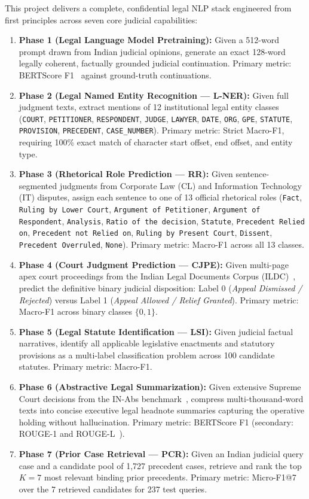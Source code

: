 \documentclass[11pt, oneside]{article}
\begin{document}
This project delivers a complete, confidential legal NLP stack engineered from first principles across seven core judicial capabilities:
\begin{enumerate}
    \item \textbf{Phase 1 (Legal Language Model Pretraining):} Given a 512-word prompt drawn from Indian judicial opinions, generate an exact 128-word legally coherent, factually grounded judicial continuation. Primary metric: BERTScore F1~\cite{zhang2020bertscore} against ground-truth continuations.
    \item \textbf{Phase 2 (Legal Named Entity Recognition --- L-NER):} Given full judgment texts, extract mentions of 12 institutional legal entity classes (\texttt{COURT}, \texttt{PETITIONER}, \texttt{RESPONDENT}, \texttt{JUDGE}, \texttt{LAWYER}, \texttt{DATE}, \texttt{ORG}, \texttt{GPE}, \texttt{STATUTE}, \texttt{PROVISION}, \texttt{PRECEDENT}, \texttt{CASE\_NUMBER}). Primary metric: Strict Macro-F1, requiring 100\% exact match of character start offset, end offset, and entity type.
    \item \textbf{Phase 3 (Rhetorical Role Prediction --- RR):} Given sentence-segmented judgments from Corporate Law (CL) and Information Technology (IT) disputes, assign each sentence to one of 13 official rhetorical roles (\texttt{Fact}, \texttt{Ruling by Lower Court}, \texttt{Argument of Petitioner}, \texttt{Argument of Respondent}, \texttt{Analysis}, \texttt{Ratio of the decision}, \texttt{Statute}, \texttt{Precedent Relied on}, \texttt{Precedent not Relied on}, \texttt{Ruling by Present Court}, \texttt{Dissent}, \texttt{Precedent Overruled}, \texttt{None}). Primary metric: Macro-F1 across all 13 classes.
    \item \textbf{Phase 4 (Court Judgment Prediction --- CJPE):} Given multi-page apex court proceedings from the Indian Legal Documents Corpus (ILDC)~\cite{malik2021ildc}, predict the definitive binary judicial disposition: Label 0 (\emph{Appeal Dismissed / Rejected}) versus Label 1 (\emph{Appeal Allowed / Relief Granted}). Primary metric: Macro-F1 across binary classes $\{0, 1\}$.
    \item \textbf{Phase 5 (Legal Statute Identification --- LSI):} Given judicial factual narratives, identify all applicable legislative enactments and statutory provisions as a multi-label classification problem across 100 candidate statutes. Primary metric: Macro-F1.
    \item \textbf{Phase 6 (Abstractive Legal Summarization):} Given extensive Supreme Court decisions from the IN-Abs benchmark~\cite{bhattacharya2019inabs}, compress multi-thousand-word texts into concise executive legal headnote summaries capturing the operative holding without hallucination. Primary metric: BERTScore F1 (secondary: ROUGE-1 and ROUGE-L~\cite{lin2004rouge}).
    \item \textbf{Phase 7 (Prior Case Retrieval --- PCR):} Given an Indian judicial query case and a candidate pool of 1,727 precedent cases, retrieve and rank the top $K=7$ most relevant binding prior precedents. Primary metric: Micro-F1@7 over the 7 retrieved candidates for 237 test queries.
\end{enumerate}
\end{document}
